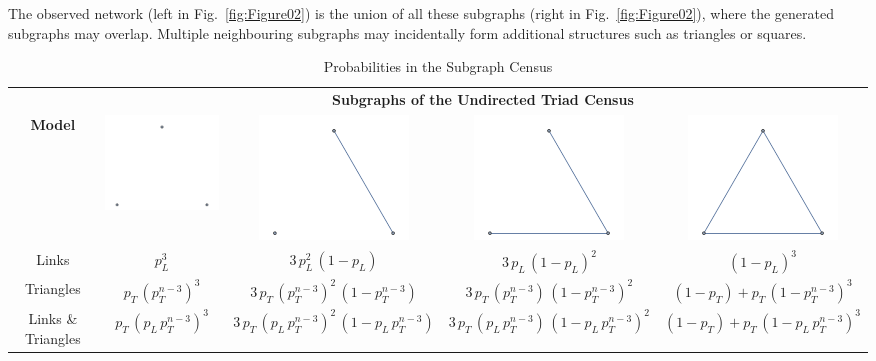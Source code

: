\documentclass[conference]{IEEEtran}
\begin{document}
The observed network (left in Fig.~\ref{fig:Figure02}) is the union of all these subgraphs (right in Fig.~\ref{fig:Figure02}), where the generated subgraphs may overlap. Multiple neighbouring subgraphs may incidentally form additional structures such as triangles or squares.

\begin{table}[b]
\def\arraystretch{1.6}
\caption{Probabilities in the Subgraph Census}
\begin{center}
\begin{tabular}{|c|c|c|c|c|}
\hline
\textbf{}&\multicolumn{4}{|c|}{\textbf{Subgraphs of the Undirected Triad Census}} \\
\cline{2-5}
\textbf{Model}&\includegraphics[scale=0.8]{Figure03_1.pdf}&\includegraphics[scale=.8]{Figure03_2.pdf}&\includegraphics[scale=.8]{Figure03_3.pdf}&\includegraphics[scale=.8]{Figure03_4.pdf}\\
\hline
Links & $p_{L}^{3}$ & $3 \, p_{L}^{2} \, (1-p_{L})$ & $3 \, p_{L} \, (1-p_{L})^{2}$ & $(1-p_{L})^{3}$ \\
\hline
Triangles & $p_{T} \, (p_{T}^{n - 3})^{3}$ & $3 \, p_{T} \, (p_{T}^{n - 3})^{2} \, (1 - p_{T}^{n - 3})$ & $3 \, p_{T} \, (p_{T}^{n - 3}) \, (1-p_{T}^{n - 3})^{2}$ & $(1 - p_{T}) + p_{T} \, (1 - p_{T}^{n - 3})^{3}$ \\
\hline
Links \& Triangles & $p_{T} \, (p_{L} \, p_{T}^{n - 3})^{3}$ & $3 \, p_{T} \, (p_{L} \, p_{T}^{n - 3})^{2} \, (1 - p_{L} \, p_{T}^{n - 3})$ & $3 \, p_{T} \, (p_{L} \, p_{T}^{n - 3}) \, (1 - p_{L} \, p_{T}^{n - 3})^{2}$ & $(1 - p_{T}) + p_{T} \, (1 - p_{L} \, p_{T}^{n - 3})^{3}$ \\
\hline
\end{tabular}
\label{tab:Table1}
\end{center}
\end{table}
\end{document}
